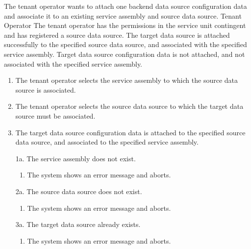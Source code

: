 {The tenant operator wants to attach one backend data source configuration data and associate it to an existing service assembly and source data source.}
{Tenant Operator}
{The tenant operator has the permissions in the service unit contingent and has registered a source data source.}
{The target data source is attached successfully to the specified source data source, and associated with the specified service assembly.}
{Target data source configuration data is not attached, and not associated with the specified service assembly.}
{\begin{enumerate}
	\item The tenant operator selects the service assembly to which the source data source is associated.
	\item The tenant operator selects the source data source to which the target data source must be associated.
	\item The target data source configuration data is attached to the specified source data source, and associated to the specified service assembly.
\end{enumerate}}
{\begin{enumerate}
	\item[1a.] The service assembly does not exist.
		\begin{enumerate}
			\item The system shows an error message and aborts.
		\end{enumerate}
	\item[2a.] The source data source does not exist.
		\begin{enumerate}
			\item The system shows an error message and aborts.
		\end{enumerate}
	\item[3a.] The target data source already exists.
		\begin{enumerate}
			\item The system shows an error message and aborts.
		\end{enumerate}
\end{enumerate}}

